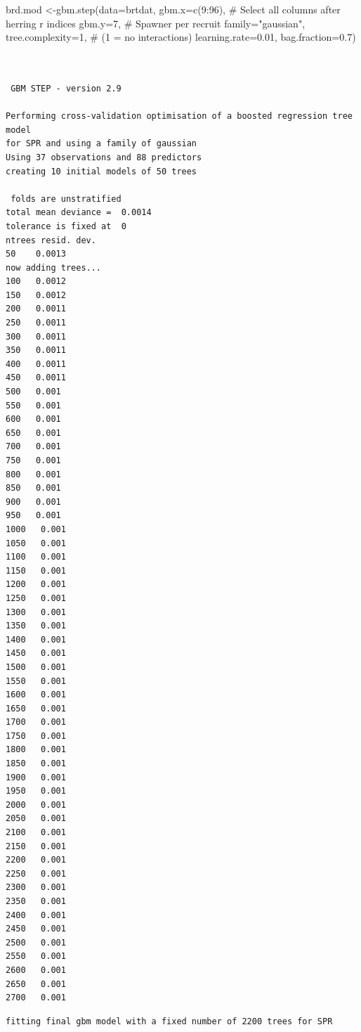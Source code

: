 \documentclass[
  letterpaper,
  DIV=11,
  numbers=noendperiod]{scrartcl}
\newenvironment{Shaded}{\begin{snugshade}}{\end{snugshade}}
\newcommand{\AttributeTok}[1]{\textcolor[rgb]{0.40,0.45,0.13}{#1}}
\newcommand{\CommentTok}[1]{\textcolor[rgb]{0.37,0.37,0.37}{#1}}
\newcommand{\DecValTok}[1]{\textcolor[rgb]{0.68,0.00,0.00}{#1}}
\newcommand{\FloatTok}[1]{\textcolor[rgb]{0.68,0.00,0.00}{#1}}
\newcommand{\FunctionTok}[1]{\textcolor[rgb]{0.28,0.35,0.67}{#1}}
\newcommand{\NormalTok}[1]{\textcolor[rgb]{0.00,0.23,0.31}{#1}}
\newcommand{\OtherTok}[1]{\textcolor[rgb]{0.00,0.23,0.31}{#1}}
\newcommand{\SpecialCharTok}[1]{\textcolor[rgb]{0.37,0.37,0.37}{#1}}
\newcommand{\StringTok}[1]{\textcolor[rgb]{0.13,0.47,0.30}{#1}}
\begin{document}
\begin{Shaded}
\begin{Highlighting}[]
\NormalTok{brd.mod }\OtherTok{\textless{}{-}}\FunctionTok{gbm.step}\NormalTok{(}\AttributeTok{data=}\NormalTok{brtdat,}
              \AttributeTok{gbm.x=}\FunctionTok{c}\NormalTok{(}\DecValTok{9}\SpecialCharTok{:}\DecValTok{96}\NormalTok{), }\CommentTok{\# Select all columns after herring r indices}
              \AttributeTok{gbm.y=}\DecValTok{7}\NormalTok{, }\CommentTok{\# Spawner per recruit}
              \AttributeTok{family=}\StringTok{"gaussian"}\NormalTok{,}
              \AttributeTok{tree.complexity=}\DecValTok{1}\NormalTok{, }\CommentTok{\# (1 = no interactions)}
              \AttributeTok{learning.rate=}\FloatTok{0.01}\NormalTok{,}
              \AttributeTok{bag.fraction=}\FloatTok{0.7}\NormalTok{)}
\end{Highlighting}
\end{Shaded}

\begin{verbatim}

 
 GBM STEP - version 2.9 
 
Performing cross-validation optimisation of a boosted regression tree model 
for SPR and using a family of gaussian 
Using 37 observations and 88 predictors 
creating 10 initial models of 50 trees 

 folds are unstratified 
total mean deviance =  0.0014 
tolerance is fixed at  0 
ntrees resid. dev. 
50    0.0013 
now adding trees... 
100   0.0012 
150   0.0012 
200   0.0011 
250   0.0011 
300   0.0011 
350   0.0011 
400   0.0011 
450   0.0011 
500   0.001 
550   0.001 
600   0.001 
650   0.001 
700   0.001 
750   0.001 
800   0.001 
850   0.001 
900   0.001 
950   0.001 
1000   0.001 
1050   0.001 
1100   0.001 
1150   0.001 
1200   0.001 
1250   0.001 
1300   0.001 
1350   0.001 
1400   0.001 
1450   0.001 
1500   0.001 
1550   0.001 
1600   0.001 
1650   0.001 
1700   0.001 
1750   0.001 
1800   0.001 
1850   0.001 
1900   0.001 
1950   0.001 
2000   0.001 
2050   0.001 
2100   0.001 
2150   0.001 
2200   0.001 
2250   0.001 
2300   0.001 
2350   0.001 
2400   0.001 
2450   0.001 
2500   0.001 
2550   0.001 
2600   0.001 
2650   0.001 
2700   0.001 
\end{verbatim}

\begin{verbatim}
fitting final gbm model with a fixed number of 2200 trees for SPR
\end{verbatim}
\end{document}
